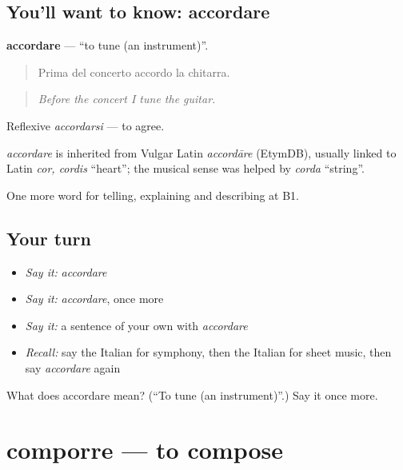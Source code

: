 \subsection*{You'll want to know: accordare}
\textbf{accordare} — \textquotedblleft{}to tune (an instrument)\textquotedblright{}.

\begin{quote}
Prima del concerto accordo la chitarra.
\end{quote}

\begin{quote}
\emph{Before the concert I tune the guitar.}
\end{quote}

Reflexive \emph{accordarsi} — to agree.

\begin{cousinweb}
\emph{accordare} is inherited from Vulgar Latin \emph{accordāre} (EtymDB), usually linked to Latin \emph{cor, cordis} \textquotedblleft{}heart\textquotedblright{}; the musical sense was helped by \emph{corda} \textquotedblleft{}string\textquotedblright{}.
\end{cousinweb}

\begin{grammarlens}[title={What you've built}]
One more word for telling, explaining and describing at B1.
\end{grammarlens}

\subsection*{Your turn}
\begin{itemize}
\raggedright
  \item \emph{Say it:} \emph{accordare}
  \item \emph{Say it:} \emph{accordare}, once more
  \item \emph{Say it:} a sentence of your own with \emph{accordare}
  \item \emph{Recall:} say the Italian for symphony, then the Italian for sheet music, then say \emph{accordare} again
\end{itemize}

\begin{tcolorbox}[breakable,colback=teal!4,colframe=teal!35!black,title={Before you move on}]
What does accordare mean? (\textquotedblleft{}To tune (an instrument)\textquotedblright{}.) Say it once more.
\end{tcolorbox}
\section[comporre]{comporre — to compose}

